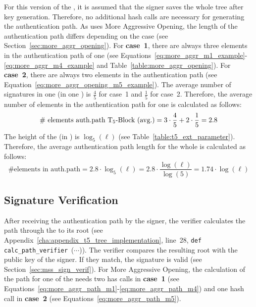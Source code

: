 For this version of the \extree, it is assumed that the signer saves the whole tree  after key generation. Therefore, no additional hash calls are necessary for generating the authentication path.
As \extree uses More Aggressive Opening, the length of the authentication path differs depending on the case (see Section~\ref{sec:more_aggr_opening}).
For \textbf{case~1}, there are always three elements in the authentication path of one \tfblock (see Equations~\ref{eq:more_aggr_m1_example}-\ref{eq:more_aggr_m4_example} and Table~\ref{table:more_aggr_opening}).
For \textbf{case~2}, there are always two elements in the authentication path (see Equation~\ref{eq:more_aggr_opening_m5_example}). 
The average number of signatures in one \tfblock (in one \extree) is $\frac{4}{5}$ for case~1 and $\frac{1}{5}$ for case~2.
Therefore, the average number of elements in the authentication path for one \tfblock is calculated as follows:
\begin{equation}
\label{eq:more_aggr_len_authpath}
\text{\# elements auth.path \tfblock (avg.)} = 3 \cdot \frac{4}{5} + 2 \cdot \frac{1}{5} = 2.8
\end{equation}
The height of the \extree (in \tfblocks) is $\log_5(\ell)$ (see Table~\ref{table:t5_ext_parameter}). Therefore, the average authentication path length for the whole \extree is calculated as follows:
\begin{equation}
\label{eq:ext_t5_len_authpath}
\text{\# elements in auth.path} = 2.8 \cdot \log_5(\ell) = 2.8 \cdot \frac{\log(\ell)}{\log(5)} = 1.74 \cdot \log(\ell)
\end{equation}

\subsection{\texorpdfstring{\extree}{Ext. T5-Tree} Signature Verification}
After receiving the authentication path by the signer, the verifier calculates the path through the \extree to its root (see Appendix~\ref{cha:appendix_t5_tree_implementation}, line~28, \texttt{def calc_path_verifier}~($\cdots$)). The verifier compares the resulting root with the public key of the signer. If they match, the signature is valid (see Section~\ref{sec:mss_sign_verif}).
For More Aggressive Opening, the calculation of the path for one \tfblock of the \extree needs two has calls in \textbf{case~1} (see Equations~\ref{eq:more_aggr_path_m1}-\ref{eq:more_aggr_path_m4}) and one hash call in \textbf{case~2} (see Equations~\ref{eq:more_aggr_path_m5}).

